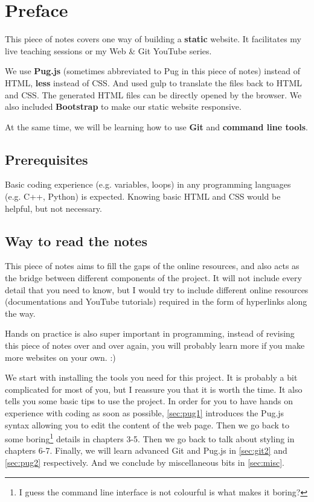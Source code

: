 \chapter*{Preface}

This piece of notes covers one way of building a \textbf{static} website. It facilitates my live teaching sessions or my Web \& Git YouTube series.
\vspace{6mm}

We use \textbf{Pug.js} (sometimes abbreviated to Pug in this piece of notes) instead of HTML, \textbf{less} instead of CSS. And used gulp to translate the files back to HTML and CSS. The generated HTML files can be directly opened by the browser. We also included \textbf{Bootstrap} to make our static website responsive.
\vspace{6mm}

At the same time, we will be learning how to use \textbf{Git} and \textbf{command line tools}.

\section{Prerequisites}

Basic coding experience (e.g. variables, loops) in any programming languages (e.g. C++, Python) is expected. Knowing basic HTML and CSS would be helpful, but not necessary. 

\section{Way to read the notes}

This piece of notes aims to fill the gaps of the online resources, and also acts as the bridge between different components of the project. It will not include every detail that you need to know, but I would try to include different online resources (documentations and YouTube tutorials) required in the form of hyperlinks along the way.
\vspace{6mm}

Hands on practice is also super important in programming, instead of revising this piece of notes over and over again, you will probably learn more if you make more websites on your own. :)
\vspace{6mm}

We start with installing the tools you need for this project. It is probably a bit complicated for most of you, but I reassure you that it is worth the time. It also tells you some basic tips to use the project. In order for you to have hands on experience with coding as soon as possible, \cref{sec:pug1} introduces the Pug.js syntax allowing you to edit the content of the web page. Then we go back to some boring\footnote{I guess the command line interface is not colourful is what makes it boring?} details in chapters 3-5. Then we go back to talk about styling in chapters 6-7. Finally, we will learn advanced Git and Pug.js in \cref{sec:git2} and \cref{sec:pug2} respectively. And we conclude by miscellaneous bits in \cref{sec:misc}.
\vspace{6mm}

